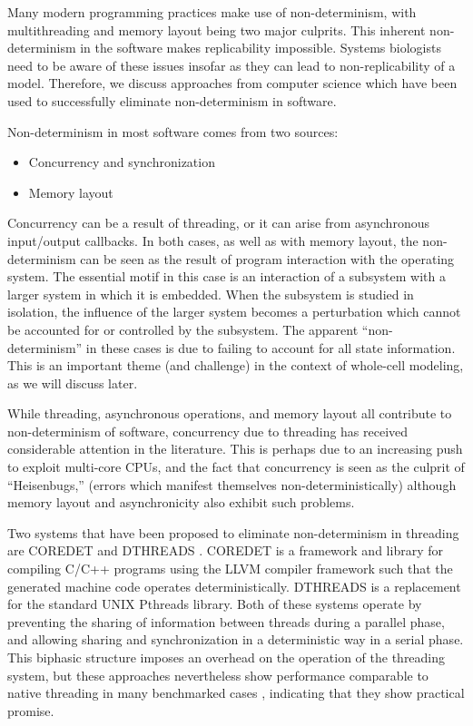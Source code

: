 \documentclass[journal,transmag,twoside]{IEEEtran}
\begin{document}
Many modern programming practices make use of non-determinism, with
multithreading and memory layout being two major culprits.
This inherent non-determinism in the software makes replicability
impossible.
Systems biologists need to be aware of these issues insofar as they
can lead to non-replicability of a model.
Therefore, we discuss approaches from computer science which
have been used to successfully eliminate non-determinism
in software.

Non-determinism in most software comes from two sources:

\begin{itemize}
\item Concurrency and synchronization
\item Memory layout
\end{itemize}

Concurrency can be a result of threading, or it can arise from
asynchronous input/output callbacks. In both cases, as well as with memory layout,
the non-determinism
can be seen as the result
of program interaction with the operating system.
The essential motif in this case is an interaction of a subsystem
with a larger system in which it is embedded.
When the subsystem is studied in isolation, the influence of the larger
system becomes a perturbation which cannot be accounted for or controlled by
the subsystem. The apparent ``non-determinism'' in these cases
is due to failing to account for all state information.
This is an important theme (and challenge) in the context of whole-cell modeling,
as we will discuss later. %

While threading, asynchronous operations, and memory layout all contribute
to non-determinism of software,
concurrency due to threading has received considerable attention in the literature.
This is perhaps due to an increasing push to exploit multi-core CPUs,
and the fact that concurrency is seen as the culprit of ``Heisenbugs,''
(errors which manifest themselves non-deterministically)
although memory layout and asynchronicity also exhibit such problems.

Two systems that have been proposed to eliminate non-determinism in threading
are C{\small ORE}D{\small ET} \cite{bergan2010coredet} and D{\small THREADS} \cite{liu2011dthreads}.
C{\small ORE}D{\small ET} is a framework and library for compiling C/C++ programs
using the LLVM compiler framework such that the generated machine code operates deterministically.
D{\small THREADS} is a replacement for the standard UNIX Pthreads library.
Both of these systems operate by preventing the sharing of information between
threads during a parallel phase, and allowing sharing and synchronization
in a deterministic way in a serial phase.
This biphasic structure imposes an overhead on the operation of the threading
system, but these approaches nevertheless show performance comparable to native
threading in many benchmarked cases \cite{liu2011dthreads}, indicating that they show
practical promise.
\end{document}

